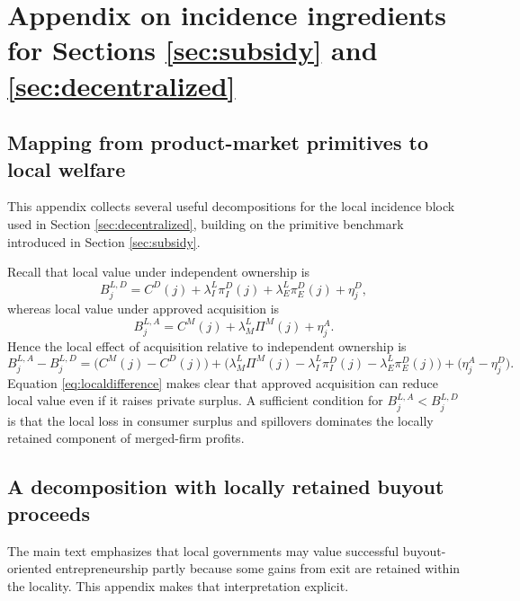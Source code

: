 \section{Appendix on incidence ingredients for Sections \ref{sec:subsidy} and \ref{sec:decentralized}}\label{app:subsidy}

\subsection{Mapping from product-market primitives to local welfare}

This appendix collects several useful decompositions for the local incidence block used in Section \ref{sec:decentralized}, building on the primitive benchmark introduced in Section \ref{sec:subsidy}.

Recall that local value under independent ownership is
\begin{equation}
    B_j^{L,D}
    =
    C^D(j)
    + \lambda_I^L \pi_I^D(j)
    + \lambda_E^L \pi_E^D(j)
    + \eta_j^D,
\end{equation}
whereas local value under approved acquisition is
\begin{equation}
    B_j^{L,A}
    =
    C^M(j)
    + \lambda_M^L \Pi^M(j)
    + \eta_j^A.
\end{equation}
Hence the local effect of acquisition relative to independent ownership is
\begin{equation}\label{eq:localdifference}
    B_j^{L,A}-B_j^{L,D}
    =
    \bigl(C^M(j)-C^D(j)\bigr)
    +
    \bigl(\lambda_M^L \Pi^M(j)-\lambda_I^L \pi_I^D(j)-\lambda_E^L \pi_E^D(j)\bigr)
    +
    \bigl(\eta_j^A-\eta_j^D\bigr).
\end{equation}
Equation \eqref{eq:localdifference} makes clear that approved acquisition can reduce local value even if it raises private surplus.
A sufficient condition for \(B_j^{L,A}<B_j^{L,D}\) is that the local loss in consumer surplus and spillovers dominates the locally retained component of merged-firm profits.

\subsection{A decomposition with locally retained buyout proceeds}\label{app:localbuyoutproceeds}

The main text emphasizes that local governments may value successful buyout-oriented entrepreneurship partly because some gains from exit are retained within the locality.
This appendix makes that interpretation explicit.

